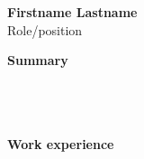 \documentclass{article}
\newcommand{\imageheight}{5.5cm}
\newcommand{\divider}[4][black]{\color{#1}{\rule[#2]{#3}{#4}}}
\begin{document}
    \begin{minipage}[t]{0.65\textwidth}
        \vspace{-\imageheight}
        \begin{center}
            \vspace{55.5px}
            {\Huge \textbf{Firstname Lastname}}\\
            \vspace{10px}
            {\huge Role/position}
            \divider[gray]{-50pt}{12.15cm}{0.4pt}
        \end{center}
        \hspace{20px}
        \begin{minipage}[t][0.5\textheight]{0.92\textwidth}
            \textbf{Summary}\\\vspace{-2px}\\
            \parbox[500pt]{\linewidth}{\lipsum[1][1-12]}\\\vspace{6px}\\
            \textbf{Work experience}


\end{minipage}
\end{minipage}
\end{document}
